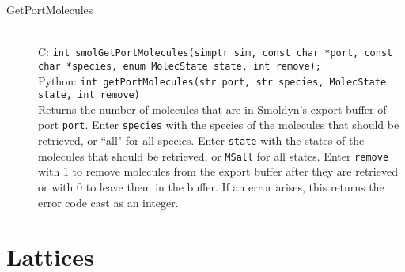 \documentclass {book}
\begin{document}
\begin{description}
\item[GetPortMolecules]
\hfill \\
C: \texttt{int smolGetPortMolecules(simptr sim, const char *port, const char *species, enum MolecState state, int remove);}\\
Python: \texttt{int getPortMolecules(str port, str species, MolecState state, int remove)}\\
Returns the number of molecules that are in Smoldyn's export buffer of port \texttt{port}. Enter \texttt{species} with the species of the molecules that should be retrieved, or ``all" for all species. Enter \texttt{state} with the states of the molecules that should be retrieved, or \texttt{MSall} for all states. Enter \texttt{remove} with 1 to remove molecules from the export buffer after they are retrieved or with 0 to leave them in the buffer. If an error arises, this returns the error code cast as an integer.

\end{description}


\section{Lattices}
\end{document}

